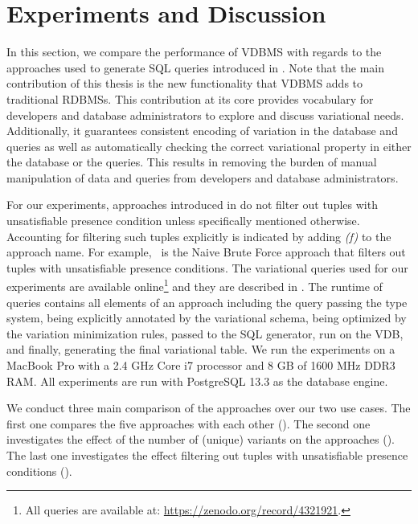 \section{Experiments and Discussion}
\label{sec:exp}


In this section, we compare the performance of VDBMS with regards
to the approaches used to generate SQL queries introduced in .
%
Note that the main contribution of this thesis is the new functionality that VDBMS 
adds to traditional RDBMSs. This contribution at its core provides vocabulary for developers
and database administrators to explore and discuss variational needs. 
%
Additionally, it guarantees consistent encoding of variation in the database and
queries as well as automatically checking the correct variational property in either
the database or the queries. This results in removing the burden of manual 
manipulation of data and queries from developers and database administrators. 

%
For our experiments, approaches introduced in  do not filter out 
tuples with unsatisfiable presence condition unless specifically mentioned otherwise.
Accounting for filtering such tuples explicitly is indicated by adding \emph{(f)} to
the approach name. For example, \nbff\ is the Naive Brute Force approach that 
filters out tuples with unsatisfiable presence conditions. 
%
The variational queries used for our experiments are available online\footnote{All queries are available at: \url{https://zenodo.org/record/4321921}.}
and they are described in .
%
The runtime of queries contains all elements of an approach including the query
passing the type system, being explicitly annotated by the variational schema, 
being optimized by the variation minimization rules, passed to the SQL generator, 
run on the VDB, and finally, generating the final variational table. 
%
We run the experiments on a MacBook Pro with a 2.4 GHz Core i7 processor and 
8 GB of 1600 MHz DDR3 RAM. All experiments are run with PostgreSQL 13.3 as 
the database engine. 

We conduct three main 
comparison of the approaches over our two use cases. The first one 
compares the five approaches with each other (). The second one
investigates the effect of the number of (unique) variants on the approaches (). 
The last one investigates the effect filtering out
tuples with unsatisfiable presence conditions (). 




